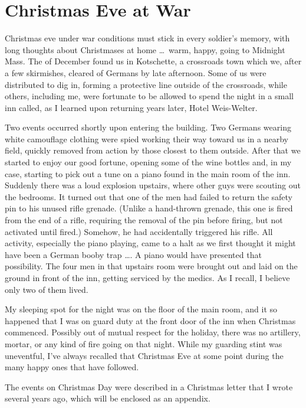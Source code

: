 \documentclass[../m3y]{subfiles}
\begin{document}
\section{Christmas Eve at War}
Christmas eve under war conditions must stick in every soldier's memory, with long thoughts about Christmases at home \ldots\ warm, happy, going to Midnight Mass. The  of December found us in Kotschette, a crossroads town which we, after a few skirmishes, cleared of Germans by late afternoon. Some of us were distributed to dig in, forming a protective line outside of the crossroads, while others, including me, were fortunate to be allowed to spend the night in a small inn called, as I learned upon returning years later, Hotel Weis-Welter.

Two events occurred shortly upon entering the building. Two Germans wearing white camouflage clothing were spied working their way toward us in a nearby field, quickly removed from action by those closest to them outside. After that we started to enjoy our good fortune, opening some of the wine bottles and, in my case, starting to pick out a tune on a piano found in the main room of the inn. Suddenly there was a loud explosion upstairs, where other guys were scouting out the bedrooms. It turned out that one of the men had failed to return the safety pin to his unused rifle grenade. (Unlike a hand-thrown grenade, this one is fired from the end of a rifle, requiring the removal of the pin before firing, but not activated until fired.) Somehow, he had accidentally triggered his rifle. All activity, especially the piano playing, came to a halt as we first thought it might have been a German booby trap \ldots. A piano would have presented that possibility. The four men in that upstairs room were brought out and laid on the ground in front of the inn, getting serviced by the medics. As I recall, I believe only two of them lived.

My sleeping spot for the night was on the floor of the main room, and it so happened that I was on guard duty at the front door of the inn when Christmas commenced. Possibly out of mutual respect for the holiday, there was no artillery, mortar, or any kind of fire going on that night. While my guarding stint was uneventful, I've always recalled that Christmas Eve at some point during the many happy ones that have followed.

The events on Christmas Day were described in a Christmas letter that I wrote several years ago, which will be enclosed as an appendix.
\end{document}
